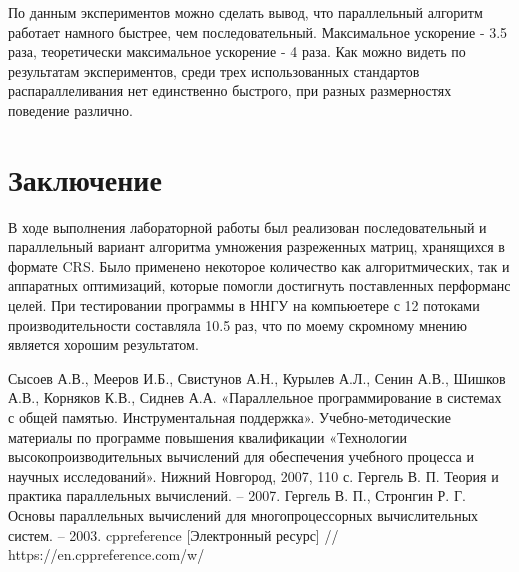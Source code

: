 \documentclass{report}
\begin{document}
\par По данным экспериментов можно сделать вывод, что параллельный алгоритм работает намного быстрее, чем последовательный. Максимальное ускорение - 3.5 раза, теоретически максимальное ускорение - 4 раза. Как можно видеть по результатам экспериментов, среди трех использованных стандартов распараллеливания нет единственно быстрого, при разных размерностях поведение различно.
\newpage

\section*{Заключение}
В ходе выполнения лабораторной работы был реализован последовательный и параллельный вариант алгоритма умножения разреженных матриц, хранящихся в формате CRS. Было применено некоторое количество как алгоритмических, так и аппаратных оптимизаций, которые помогли достигнуть поставленных перформанс целей. При тестировании программы в ННГУ на компьюетере с 12 потоками производительности составляла 10.5 раз, что по моему скромному мнению является хорошим результатом.

\newpage

\begin{thebibliography}{1}
 Сысоев А.В., Мееров И.Б., Свистунов А.Н., Курылев А.Л., Сенин А.В., Шишков А.В., Корняков К.В., Сиднев А.А. «Параллельное программирование в системах с общей памятью. Инструментальная поддержка». Учебно-методические материалы по программе повышения квалификации «Технологии высокопроизводительных вычислений для обеспечения учебного процесса и научных исследований». Нижний Новгород, 2007, 110 с. 
Гергель В. П. Теория и практика параллельных вычислений. – 2007. 
Гергель В. П., Стронгин Р. Г. Основы параллельных вычислений для многопроцессорных вычислительных систем. – 2003.
 cppreference [Электронный ресурс] // https://en.cppreference.com/w/
\end{thebibliography}
\end{document}
